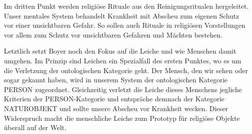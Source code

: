 Im dritten Punkt werden religiöse Rituale aus den Reinigungsritualen her\-geleitet. Unser mentales System behandelt Krankheit mit Abscheu zum ei\-genen Schutz vor einer unsichtbaren Gefahr. So sollen auch Rituale in religiösen Vorstellungen vor allem zum Schutz vor unsichtbaren Gefahren und Mächten bestehen. 

Letztlich setzt Boyer noch den Fokus auf die Leiche und wie Menschen damit umgehen. Im Prinzip sind Leichen ein Spezialfall des ersten Punktes, wo es um die Verletzung der ontologischen Kategorie geht. Der Mensch, den wir sehen oder sogar gekannt haben, wird in unserem System der ontologischen Kategorie PERSON zugeordnet. Gleichzeitig verletzt die Leiche dieses Menschens jegliche Kriterien der PERSON-Kategorie und entspräche demnach der Kategorie NATUROBJEKT und sollte unsere Abscheu vor Krankheit wecken. Dieser Widerspruch macht die menschliche Leiche zum Prototyp für religiöse Objekte überall auf der Welt.